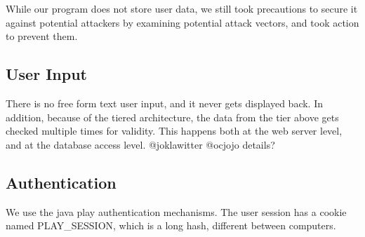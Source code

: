 
While our program does not store user data,
we still took precautions to secure it against potential attackers by examining 
potential attack vectors, and took action to prevent them.

\subsection{User Input}
There is no free form text user input, and it never gets displayed back.
In addition, because of the tiered architecture, the data from the tier above gets checked multiple times for validity.
This happens both at the web server level, and at the database access level.
@joklawitter @ocjojo details?

\subsection{Authentication}
We use the java play authentication mechanisms.
The user session has a cookie named PLAY\_SESSION, which is a long hash, different between computers.

